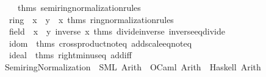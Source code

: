 \begin{isabellebody}
\ \ \ \ \ \ {\isacharat}{\kern0pt}{\isacharbraceleft}{\kern0pt}thms\ semiring{\isacharunderscore}{\kern0pt}normalization{\isacharunderscore}{\kern0pt}rules{\isacharbraceright}{\kern0pt}{\isacharparenright}{\kern0pt}{\isacharcomma}{\kern0pt}\isanewline
\ \ \ \ ring\ {\isacharequal}{\kern0pt}\ {\isacharparenleft}{\kern0pt}{\isacharbrackleft}{\kern0pt}\isactrlterm {\isasymopen}x\ {\isacharminus}{\kern0pt}\ y{\isasymclose}{\isacharcomma}{\kern0pt}\ \isactrlterm {\isasymopen}{\isacharminus}{\kern0pt}\ x{\isasymclose}{\isacharbrackright}{\kern0pt}{\isacharcomma}{\kern0pt}\ {\isacharat}{\kern0pt}{\isacharbraceleft}{\kern0pt}thms\ ring{\isacharunderscore}{\kern0pt}normalization{\isacharunderscore}{\kern0pt}rules{\isacharbraceright}{\kern0pt}{\isacharparenright}{\kern0pt}{\isacharcomma}{\kern0pt}\isanewline
\ \ \ \ field\ {\isacharequal}{\kern0pt}\ {\isacharparenleft}{\kern0pt}{\isacharbrackleft}{\kern0pt}\isactrlterm {\isasymopen}x\ {\isacharslash}{\kern0pt}\ y{\isasymclose}{\isacharcomma}{\kern0pt}\ \isactrlterm {\isasymopen}inverse\ x{\isasymclose}{\isacharbrackright}{\kern0pt}{\isacharcomma}{\kern0pt}\ {\isacharat}{\kern0pt}{\isacharbraceleft}{\kern0pt}thms\ divide{\isacharunderscore}{\kern0pt}inverse\ inverse{\isacharunderscore}{\kern0pt}eq{\isacharunderscore}{\kern0pt}divide{\isacharbraceright}{\kern0pt}{\isacharparenright}{\kern0pt}{\isacharcomma}{\kern0pt}\isanewline
\ \ \ \ idom\ {\isacharequal}{\kern0pt}\ {\isacharat}{\kern0pt}{\isacharbraceleft}{\kern0pt}thms\ crossproduct{\isacharunderscore}{\kern0pt}noteq\ add{\isacharunderscore}{\kern0pt}scale{\isacharunderscore}{\kern0pt}eq{\isacharunderscore}{\kern0pt}noteq{\isacharbraceright}{\kern0pt}{\isacharcomma}{\kern0pt}\isanewline
\ \ \ \ ideal\ {\isacharequal}{\kern0pt}\ {\isacharat}{\kern0pt}{\isacharbraceleft}{\kern0pt}thms\ right{\isacharunderscore}{\kern0pt}minus{\isacharunderscore}{\kern0pt}eq\ add{\isacharunderscore}{\kern0pt}{}{\isacharunderscore}{\kern0pt}iff{\isacharbraceright}{\kern0pt}{\isacharbraceright}{\kern0pt}\isanewline
{\isacartoucheclose}%
\endisatagML
{\isafoldML}%
%
\isadelimML
\isanewline
%
\endisadelimML
\isanewline
{}\isamarkupfalse%
\isanewline
\isanewline
{}\isamarkupfalse%
\isanewline
\ \ \ Semiring{\isacharunderscore}{\kern0pt}Normalization\ {\isasymrightharpoonup}\ {\isacharparenleft}{\kern0pt}SML{\isacharparenright}{\kern0pt}\ Arith\ \ {\isacharparenleft}{\kern0pt}OCaml{\isacharparenright}{\kern0pt}\ Arith\ \ {\isacharparenleft}{\kern0pt}Haskell{\isacharparenright}{\kern0pt}\ Arith\isanewline
%
\isadelimtheory
\isanewline
%
\endisadelimtheory
%
\isatagtheory
{}\isamarkupfalse%
%
\endisatagtheory
{\isafoldtheory}%
%
\isadelimtheory
%
\endisadelimtheory
%
\end{isabellebody}%
